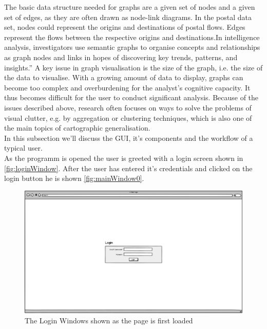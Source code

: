 \documentclass[twoside, english, draft]{Pflichtenheft}
\begin{document}
The basic data structure needed for graphs are a given set of nodes and a given set of edges, as they are often drawn
as node-link diagrams. In the postal data set, nodes could represent the origins and destinations of postal flows. Edges represent the flows between the respective origins and destinations.In intelligence analysis, investigators use semantic graphs to organise concepts and relationships as graph nodes and links in hopes of discovering key trends, patterns, and insights.” A key issue in graph visualisation is the size of the graph, i.e. the size of the data to visualise. With a growing amount of data to display, graphs can become too complex and overburdening for the analyst’s cognitive capacity. It thus becomes difficult for the user to conduct significant analysis. Because of the issues described above, research often focuses on ways to solve the problems of visual clutter, e.g. by aggregation or clustering techniques, which is also one of the main topics of cartographic generalisation.
\\
In this subsection we'll discuss the GUI, it's components and the workflow of a typical user.
\\
As the programm is opened the user is greeted with a login screen shown in \autoref{fig:loginWindow}. After the user has entered it's credentials and clicked on the login button he is shown \autoref{fig:mainWindow0}.
\\
\vfill

\begin{figure}[h]
\centering
\includegraphics[width=\textwidth]{Images/01MWL.png}
	\caption{The Login Windows shown as the page is first loaded}
	\label{fig:loginWindow}
\end{figure}
\end{document}
